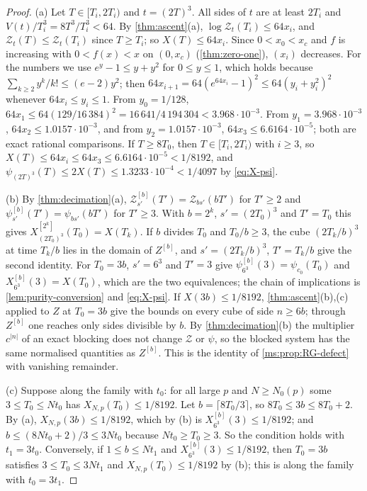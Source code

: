 \documentclass[11pt,a4paper]{amsart}
\theoremstyle{definition}
\theoremstyle{remark}
\numberwithin{equation}{section}
\newcommand{\TT}{\mathbb{T}}               %
\newcommand{\Zc}{\mathcal{Z}}              %
\newcommand{\Zs}[2]{\Zc_{#1}(#2)}          %
\newcommand{\psiT}[2]{\psi_{#1}(#2)}       %
\newcommand{\Vol}[1]{V(#1)}                %
\newcommand{\cube}[1]{(2#1)^3}             %
\newcommand{\dconst}{\frac{1}{4097}}       %
\newcommand{\xconst}{\frac{1}{8192}}       %
\newcommand{\dconstinl}{1/4097}            %
\newcommand{\xconstinl}{1/8192}            %
\newcommand{\Bcirc}{\text{\upshape(B$^{\circ}$)}}   %
\newcommand{\tzero}{t_0}                   %
\begin{document}
\begin{proof}
(a) Let $T\in[T_i,2T_i)$ and $t=\cube{T}$. All sides of $t$ are at least $2T_i$ and $\Vol{t}/T_i^3=8T^3/T_i^3<64$. By \cref{thm:ascent}(a), $\log\Zs{t}{T_i}\le64x_i$, and $\Zs{t}{T}\le\Zs{t}{T_i}$ since $T\ge T_i$; so $X(T)\le64x_i$. Since $0<x_0<x_c$ and $f$ is increasing with $0<f(x)<x$ on $(0,x_c)$ (\cref{thm:zero-one}), $(x_i)$ decreases. For the numbers we use $e^y-1\le y+y^2$ for $0\le y\le1$, which holds because $\sum_{k\ge2}y^k/k!\le(e-2)y^2$; then $64x_{i+1}=64(e^{64x_i}-1)^2\le64(y_i+y_i^2)^2$ whenever $64x_i\le y_i\le1$. From $y_0=1/128$, $64x_1\le64(129/16\,384)^2=16\,641/4\,194\,304<3.968\cdot10^{-3}$. From $y_1=3.968\cdot10^{-3}$, $64x_2\le1.0157\cdot10^{-3}$, and from $y_2=1.0157\cdot10^{-3}$, $64x_3\le6.6164\cdot10^{-5}$; both are exact rational comparisons. If $T\ge8T_0$, then $T\in[T_i,2T_i)$ with $i\ge3$, so $X(T)\le64x_i\le64x_3\le6.6164\cdot10^{-5}<\xconstinl$, and $\psiT{\cube{T}}{T}\le2X(T)\le1.3233\cdot10^{-4}<\dconstinl$ by \eqref{eq:X-psi}.

(b) By \cref{thm:decimation}(a), $\Zc^{[b]}_{s'}(T')=\Zs{bs'}{bT'}$ for $T'\ge2$ and $\psi^{[b]}_{s'}(T')=\psiT{bs'}{bT'}$ for $T'\ge3$. With $b=2^k$, $s'=\cube{T_0}$ and $T'=T_0$ this gives $X^{[2^k]}_{\cube{T_0}}(T_0)=X(T_k)$. If $b$ divides $T_0$ and $T_0/b\ge3$, the cube $(2T_k/b)^3$ at time $T_k/b$ lies in the domain of $Z^{[b]}$, and $s'=(2T_k/b)^3$, $T'=T_k/b$ give the second identity. For $T_0=3b$, $s'=6^3$ and $T'=3$ give $\psi^{[b]}_{6^3}(3)=\psiT{c_0}{T_0}$ and $X^{[b]}_{6^3}(3)=X(T_0)$, which are the two equivalences; the chain of implications is \cref{lem:purity-conversion} and \eqref{eq:X-psi}. If $X(3b)\le\xconstinl$, \cref{thm:ascent}(b),(c) applied to $Z$ at $T_0=3b$ give the bounds on every cube of side $n\ge6b$; through $Z^{[b]}$ one reaches only sides divisible by $b$. By \cref{thm:decimation}(b) the multiplier $c^{|n|}$ of an exact blocking does not change $\Zc$ or $\psi$, so the blocked system has the same normalised quantities as $Z^{[b]}$. This is the identity of \cref{ms:prop:RG-defect} with vanishing remainder.

(c) Suppose \Bcirc{} along the family with $\tzero$: for all large $p$ and $N\ge N_0(p)$ some $3\le T_0\le N\tzero$ has $X_{N,p}(T_0)\le\xconstinl$. Let $b=\lceil8T_0/3\rceil$, so $8T_0\le3b\le8T_0+2$. By (a), $X_{N,p}(3b)\le\xconstinl$, which by (b) is $X^{[b]}_{6^3}(3)\le\xconstinl$; and $b\le(8N\tzero+2)/3\le3N\tzero$ because $N\tzero\ge T_0\ge3$. So the condition holds with $t_1=3\tzero$. Conversely, if $1\le b\le Nt_1$ and $X^{[b]}_{6^3}(3)\le\xconstinl$, then $T_0=3b$ satisfies $3\le T_0\le3Nt_1$ and $X_{N,p}(T_0)\le\xconstinl$ by (b); this is \Bcirc{} along the family with $\tzero=3t_1$.
\end{proof}
\end{document}
